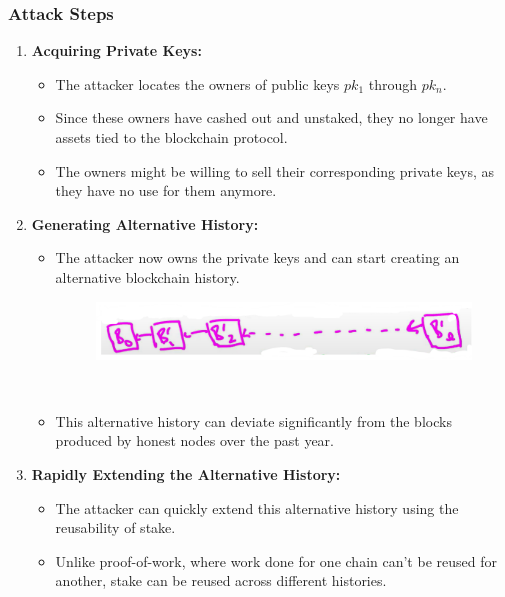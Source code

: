 \subsubsection{Attack Steps}
\begin{enumerate}
    \item \textbf{Acquiring Private Keys:}
    \begin{itemize}
        \item The attacker locates the owners of public keys $pk_1$ through $pk_n$.
        \item Since these owners have cashed out and unstaked, they no longer have assets tied to the blockchain protocol.
        \item The owners might be willing to sell their corresponding private keys, as they have no use for them anymore.
    \end{itemize}
    
    \item \textbf{Generating Alternative History:}
    \begin{itemize}
        \item The attacker now owns the private keys and can start creating an alternative blockchain history.
        \begin{figure}[h]
        \centering
        \includegraphics[scale = 0.5]{figures/f59.png}
        \caption{}
        \label{fig:mesh1}
        \end{figure}\\
        \item This alternative history can deviate significantly from the blocks produced by honest nodes over the past year.
    \end{itemize}
    
    \item \textbf{Rapidly Extending the Alternative History:}
    \begin{itemize}
        \item The attacker can quickly extend this alternative history using the reusability of stake.
        \item Unlike proof-of-work, where work done for one chain can't be reused for another, stake can be reused across different histories.
    \end{itemize}
\end{enumerate}

